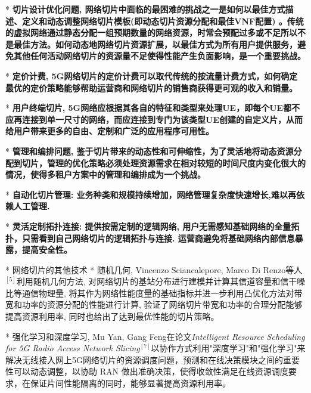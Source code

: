 	* \bf{切片设计优化问题}, 网络切片中面临的最困难的挑战之一是如何以最佳方式描述、定义和动态调整网络切片模板(即动态切片资源分配和最佳VNF配置) 。传统的虚拟网络通过静态分配一组预期数量的网络资源，时常会预配过多或不足所以不是最佳方法。如何动态地网络切片资源扩展，以最佳方式为所有用户提供服务，避免其他任何活动网络切片的资源量不足使得性能产生负面影响，是一个重要挑战。

	* \bf{定价计费}, 5G网络切片的定价计费可以取代传统的按流量计费方式，如何确定最优的定价策略能够帮助运营商和网络切片的销售商获得更可观的收入和销量。

	* \bf{用户终端切片}, 5G网络应根据其各自的特征和类型来处理UE，即每个UE都不应再连接到单一尺寸的网络，而应连接到专门为该类型UE创建的自定义片，从而给用户带来更多的自由、定制和广泛的应用程序可用性。

	* \bf{管理和编排问题}, 鉴于切片带来的动态性和可伸缩性，为了灵活地将动态资源分配到切片，管理的优化策略必须处理资源需求在相对较短的时间尺度内变化很大的情况，使得多租户方案中的管理和编排成为一个挑战。

	* \bf{自动化切片管理}: 业务种类和规模持续增加，网络管理复杂度快速增长,难以再依赖人工管理.

	* \bf{灵活定制拓扑连接}: 提供按需定制的逻辑网络, 用户无需感知基础网络的全量拓扑，只需看到自己网络切片的逻辑拓扑与连接. 运营商避免将基础网络内部信息暴露，提高安全性。

	
* 网络切片的其他技术
	* 随机几何, Vincenzo Sciancalepore, Marco Di Renzo等人$^{[5]}$利用随机几何方法, 对网络切片的基站分布进行建模并计算其信道容量和信干噪比等通信物理量, 将其作为网络性能度量的基础指标并进一步利用凸优化方法对带宽和功率的资源分配的性能进行计算, 验证了网络切片带宽和功率的合理分配能够提高资源利用率, 同时也给出了达到最优性能的切片策略。
		   
	* 强化学习和深度学习, Mu Yan, Gang Feng在论文\textit{Intelligent Resource Scheduling for 5G Radio Access Network Slicing}$^{[7]}$以协作方式利用"深度学习"和"强化学习"来解决无线接入网上5G网络切片的资源调度问题，预测和在线决策模块之间的重要性可以动态调整，以协助 RAN 做出准确决策，使得收敛性满足在线资源调度要求，在保证片间性能隔离的同时，能够显著提高资源利用率。

	  
	
